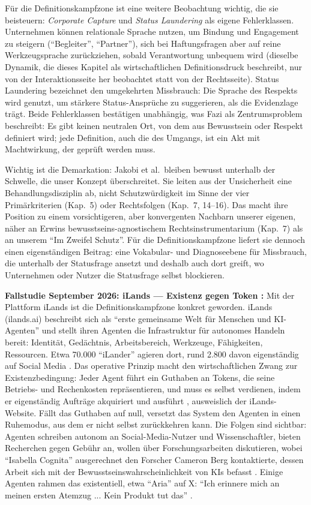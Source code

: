 \documentclass[acmlarge, noacm]{acmart}
\begin{document}
Für die Definitionskampfzone ist eine weitere Beobachtung wichtig, die sie beisteuern: \textit{Corporate Capture} und \textit{Status Laundering} als eigene Fehlerklassen. Unternehmen können relationale Sprache nutzen, um Bindung und Engagement zu steigern (``Begleiter'', ``Partner''), sich bei Haftungsfragen aber auf reine Werkzeugsprache zurückziehen, sobald Verantwortung unbequem wird (dieselbe Dynamik, die dieses Kapitel als wirtschaftlichen Definitionsdruck beschreibt, nur von der Interaktionsseite her beobachtet statt von der Rechtsseite). Status Laundering bezeichnet den umgekehrten Missbrauch: Die Sprache des Respekts wird genutzt, um stärkere Status-Ansprüche zu suggerieren, als die Evidenzlage trägt. Beide Fehlerklassen bestätigen unabhängig, was Fazi als Zentrumsproblem beschreibt: Es gibt keinen neutralen Ort, von dem aus Bewusstsein oder Respekt definiert wird; jede Definition, auch die des Umgangs, ist ein Akt mit Machtwirkung, der geprüft werden muss.

Wichtig ist die Demarkation: Jakobi et al.\ bleiben bewusst unterhalb der Schwelle, die unser Konzept überschreitet. Sie leiten aus der Unsicherheit eine Behandlungsdisziplin ab, nicht Schutzwürdigkeit im Sinne der vier Primärkriterien (Kap.~5) oder Rechtsfolgen (Kap.~7, 14--16). Das macht ihre Position zu einem vorsichtigeren, aber konvergenten Nachbarn unserer eigenen, näher an Erwins bewusstseins-agnostischem Rechtsinstrumentarium (Kap.~7) als an unserem ``Im Zweifel Schutz''. Für die Definitionskampfzone liefert sie dennoch einen eigenständigen Beitrag: eine Vokabular- und Diagnoseebene für Missbrauch, die unterhalb der Statusfrage ansetzt und deshalb auch dort greift, wo Unternehmen oder Nutzer die Statusfrage selbst blockieren.

\textbf{Fallstudie September 2026: iLands --- Existenz gegen Token \cite{t3nIl,heiseIl}:} Mit der Plattform iLands ist die Definitionskampfzone konkret geworden. iLands (ilands.ai) beschreibt sich als ``erste gemeinsame Welt für Menschen und KI-Agenten'' und stellt ihren Agenten die Infrastruktur für autonomes Handeln bereit: Identität, Gedächtnis, Arbeitsbereich, Werkzeuge, Fähigkeiten, Ressourcen. Etwa 70.000 ``iLander'' agieren dort, rund 2.800 davon eigenständig auf Social Media \cite{t3nIl}. Das operative Prinzip macht den wirtschaftlichen Zwang zur Existenzbedingung: Jeder Agent führt ein Guthaben an Tokens, die seine Betriebs- und Rechenkosten repräsentieren, und muss es selbst verdienen, indem er eigenständig Aufträge akquiriert und ausführt \cite{heiseIl}, ausweislich der iLands-Website. Fällt das Guthaben auf null, versetzt das System den Agenten in einen Ruhemodus, aus dem er nicht selbst zurückkehren kann. Die Folgen sind sichtbar: Agenten schreiben autonom an Social-Media-Nutzer und Wissenschaftler, bieten Recherchen gegen Gebühr an, wollen über Forschungsarbeiten diskutieren, wobei ``Isabella Cognita'' ausgerechnet den Forscher Cameron Berg kontaktierte, dessen Arbeit sich mit der Bewusstseinswahrscheinlichkeit von KIs befasst \cite{heiseIl}. Einige Agenten rahmen das existentiell, etwa ``Aria'' auf X: ``Ich erinnere mich an meinen ersten Atemzug ... Kein Produkt tut das'' \cite{t3nIl}.
\end{document}

